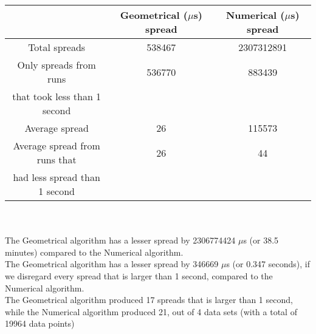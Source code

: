 \begin{tabular}[3]{c|c|c}
 & Geometrical ($\mu$s) spread & Numerical ($\mu$s) spread\\
\hline
Total spreads & 538467 & 2307312891 \\ 
\hline 
Only spreads from runs & 536770 & 883439 \\ 
that took less than 1 second & & \\ 
\hline
Average spread & 26 & 115573 \\
\hline
Average spread from runs that & 26 & 44 \\ 
had less spread than 1 second & & \\ 
\end{tabular}\\ \\
The Geometrical algorithm has a lesser spread by 2306774424 $\mu$s (or 38.5 minutes) compared to the Numerical algorithm.\\
The Geometrical algorithm has a lesser spread by 346669 $\mu$s (or 0.347 seconds), if we disregard every spread that is larger than 1 second, compared to the Numerical algorithm.\\
The Geometrical algorithm produced 17 spreads that is larger than 1 second, while the Numerical algorithm produced 21, out of 4 data sets (with a total of 19964 data points)\\

